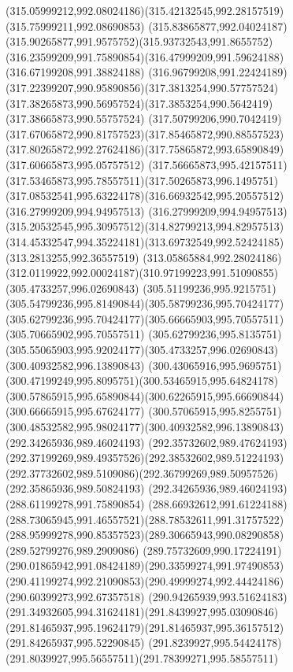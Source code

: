 {{	\curveto(315.05999212,992.08024186)(315.42132545,992.28157519)(315.75999211,992.08690853)
	\curveto(315.83865877,992.04024187)(315.90265877,991.9575752)(315.93732543,991.8655752)
	\curveto(316.23599209,991.75890854)(316.47999209,991.59624188)(316.67199208,991.38824188)
	\curveto(316.96799208,991.22424189)(317.22399207,990.95890856)(317.3813254,990.57757524)
	\curveto(317.38265873,990.56957524)(317.3853254,990.5642419)(317.38665873,990.55757524)
	\curveto(317.50799206,990.7042419)(317.67065872,990.81757523)(317.85465872,990.88557523)
	\curveto(317.80265872,992.27624186)(317.75865872,993.65890849)(317.60665873,995.05757512)
	\curveto(317.56665873,995.42157511)(317.53465873,995.78557511)(317.50265873,996.1495751)
	\curveto(317.08532541,995.63224178)(316.66932542,995.20557512)(316.27999209,994.94957513)
	\curveto(316.27999209,994.94957513)(315.20532545,995.30957512)(314.82799213,994.82957513)
	\curveto(314.45332547,994.35224181)(313.69732549,992.52424185)(313.2813255,992.36557519)
	\curveto(313.05865884,992.28024186)(312.0119922,992.00024187)(310.97199223,991.51090855)
	\moveto(305.4733257,996.02690843)
	\curveto(305.51199236,995.9215751)(305.54799236,995.81490844)(305.58799236,995.70424177)
	\curveto(305.62799236,995.70424177)(305.66665903,995.70557511)(305.70665902,995.70557511)
	\curveto(305.62799236,995.8135751)(305.55065903,995.92024177)(305.4733257,996.02690843)
	\moveto(300.40932582,996.13890843)
	\curveto(300.43065916,995.9695751)(300.47199249,995.8095751)(300.53465915,995.64824178)
	\curveto(300.57865915,995.65890844)(300.62265915,995.66690844)(300.66665915,995.67624177)
	\curveto(300.57065915,995.8255751)(300.48532582,995.98024177)(300.40932582,996.13890843)
	\moveto(292.34265936,989.46024193)
	\curveto(292.35732602,989.47624193)(292.37199269,989.49357526)(292.38532602,989.51224193)
	\curveto(292.37732602,989.5109086)(292.36799269,989.50957526)(292.35865936,989.50824193)
	\lineto(292.34265936,989.46024193)
	\moveto(288.61199278,991.75890854)
	\curveto(288.66932612,991.61224188)(288.73065945,991.46557521)(288.78532611,991.31757522)
	\curveto(288.95999278,990.85357523)(289.30665943,990.08290858)(289.52799276,989.2909086)
	\curveto(289.75732609,990.17224191)(290.01865942,991.08424189)(290.33599274,991.97490853)
	\curveto(290.41199274,992.21090853)(290.49999274,992.44424186)(290.60399273,992.67357518)
	\curveto(290.94265939,993.51624183)(291.34932605,994.31624181)(291.8439927,995.03090846)
	\curveto(291.81465937,995.19624179)(291.81465937,995.36157512)(291.84265937,995.52290845)
	\curveto(291.8239927,995.54424178)(291.8039927,995.56557511)(291.78399271,995.58557511)
}}
